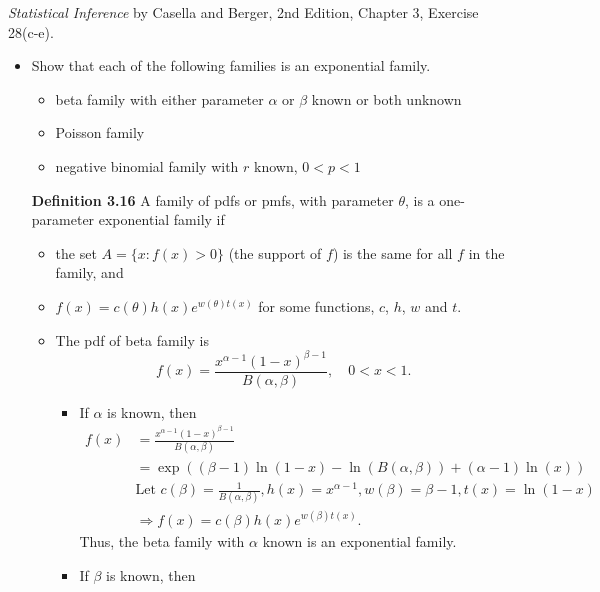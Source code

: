 \documentclass[12pt]{article}
\newenvironment{problem}[2][Problem]{\begin{trivlist}
\item[\hskip \labelsep {\bfseries #1}\hskip \labelsep {\bfseries #2.}]}
{\end{trivlist}}
\begin{document}
\begin{problem}{6}
  \textit{Statistical Inference} by Casella and Berger, 2nd Edition, Chapter 3, 
  Exercise 28(c-e).
  \begin{itemize}
    \item [28.] Show that each of the following families is an exponential family.
    \begin{itemize}
      \item [(c)] beta family with either parameter $\alpha$ or $\beta$ known or
      both unknown
      \item [(d)] Poisson family
      \item [(e)] negative binomial family with $r$ known, $0<p<1$
    \end{itemize}
    \textbf{Definition 3.16} A family of pdfs or pmfs, with parameter $\theta$, 
    is a one-parameter exponential family if
    \begin{itemize}
      \item [i.]
      the set $A = \{x : f (x) > 0\}$ (the support of $f$) is the same for 
      all $f$ in the family, and
      \item [ii.]
      $f (x) = c(\theta)h(x)e^{w(\theta)t(x)}$ for some functions, 
      $c$, $h$, $w$ and $t$.
    \end{itemize}
    \begin{itemize}
      \item [(c)] The pdf of beta family is
      \[
        f(x) = \frac{x^{\alpha - 1} (1-x)^{\beta - 1}}{B(\alpha, \beta)}, 
        \quad 0 < x < 1.
      \]
      \begin{itemize}
        \item If $\alpha$ is known, then
        \[
          \begin{aligned}
            f(x) &= \frac{x^{\alpha - 1} (1-x)^{\beta - 1}}{B(\alpha, \beta)} \\
            &= \exp\left( (\beta - 1) \ln(1-x) - \ln(B(\alpha, \beta)) + 
            (\alpha - 1) \ln(x) \right) \\
            &\text{Let } c(\beta) = \frac{1}{B(\alpha, \beta)}, 
            h(x) = x^{\alpha - 1}, w(\beta) = \beta - 1, t(x) = \ln(1-x)\\
            &\Rightarrow f(x) = c(\beta) h(x) e^{w(\beta) t(x)}.
          \end{aligned}
        \]
        Thus, the beta family with $\alpha$ known is an exponential family.
        \item If $\beta$ is known, then
        \[
          \begin{aligned}

\end{aligned}\]
\end{itemize}
\end{itemize}
\end{itemize}
\end{problem}
\end{document}
